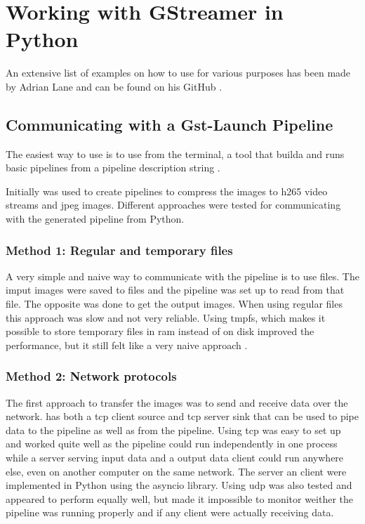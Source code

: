 
\section{Working with GStreamer in Python}
An extensive list of examples on how to use  for various purposes has been made by Adrian Lane and can be found on his GitHub \cite{laneGStreamerPipelineSamples2020}.


\subsection{Communicating with a Gst-Launch Pipeline}
The easiest way to use \gs is to use  from the terminal, a tool that builda and runs basic \gs pipelines from a pipeline description string \cite{Gstlaunch1}.

Initially  was used to create pipelines to compress the images to \gls{h265} video streams and \gls{jpeg} images.
Different approaches were tested for communicating with the generated pipeline from Python.

\subsubsection{Method 1: Regular and temporary files}
A very simple and naive way to communicate with the pipeline is to use files.
The imput images were saved to files and the pipeline was set up to read from that file.
The opposite was done to get the output images.
When using regular files this approach was slow and not very reliable.
Using \gls{tmpfs}, which makes it possible to store temporary files in \gls{ram} instead of on disk improved the performance, but it still felt like a very naive approach \cite{dickinsTmpfsLinuxKernel2010}.

\subsubsection{Method 2: Network protocols}
The first approach to transfer the images was to send and receive data over the network.
\gs has both a \gls{tcp} client source and \gls{tcp} server sink that can be used to pipe data to the pipeline as well as from the pipeline.
Using \gls{tcp} was easy to set up and worked quite well as the pipeline could run independently in one process while a server serving input data and a output data client could run anywhere else, even on another computer on the same network.
The server an client were implemented in Python using the \gls{asyncio} library.
Using \gls{udp} was also tested and appeared to perform equally well, but made it impossible to monitor weither the pipeline was running properly and if any client were actually receiving data.


